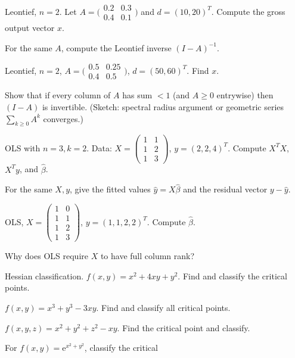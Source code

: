 \begin{problems}
  \item Leontief, $n = 2$. Let
        $A = \bigl(\begin{smallmatrix} 0.2 & 0.3 \\ 0.4 & 0.1 \end{smallmatrix}\bigr)$
        and $d = (10, 20)^{T}$. Compute the gross output vector $x$.
  \item For the same $A$, compute the Leontief inverse $(I - A)^{-1}$.
  \item Leontief, $n = 2$,
        $A = \bigl(\begin{smallmatrix} 0.5 & 0.25 \\ 0.4 & 0.5 \end{smallmatrix}\bigr)$,
        $d = (50, 60)^{T}$. Find $x$.
  \item Show that if every column of $A$ has sum $< 1$ (and $A \ge 0$
        entrywise) then $(I - A)$ is invertible. (Sketch: spectral radius
        argument or geometric series $\sum_{k \ge 0} A^{k}$ converges.)
  \item OLS with $n = 3, k = 2$. Data:
        $X = \begin{pmatrix} 1 & 1 \\ 1 & 2 \\ 1 & 3 \end{pmatrix}$,
        $y = (2, 2, 4)^{T}$. Compute $X^{T} X$, $X^{T} y$, and $\hat{\beta}$.
  \item For the same $X, y$, give the fitted values $\hat{y} = X \hat{\beta}$
        and the residual vector $y - \hat{y}$.
  \item OLS,
        $X = \begin{pmatrix} 1 & 0 \\ 1 & 1 \\ 1 & 2 \\ 1 & 3 \end{pmatrix}$,
        $y = (1, 1, 2, 2)^{T}$. Compute $\hat{\beta}$.
  \item Why does OLS require $X$ to have full column rank?
  \item Hessian classification. $f(x, y) = x^{2} + 4 x y + y^{2}$. Find and
        classify the critical points.
  \item $f(x, y) = x^{3} + y^{3} - 3 x y$. Find and classify all critical
        points.
  \item $f(x, y, z) = x^{2} + y^{2} + z^{2} - x y$. Find the critical point
        and classify.
  \item For $f(x, y) = \mathrm{e}^{x^{2} + y^{2}}$, classify the critical

\end{problems}

